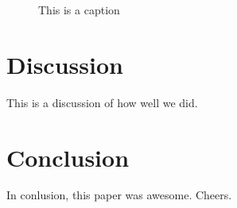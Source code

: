 \documentclass{article} %
\begin{document}
\begin{figure}[H]
\begin{center}
\end{center}
\caption{This is a caption}
\label{fig:ortho_mediume}
\end{figure}


\section{Discussion}
This is a discussion of how well we did.

\section{Conclusion}
In conlusion, this paper was awesome. Cheers.



\end{document}
